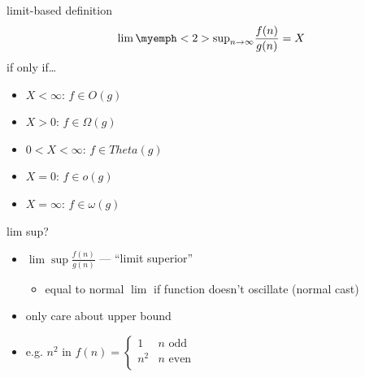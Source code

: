 \begin{frame}{limit-based definition}
\[\lim\myemph<2>{\sup}_{n\to\infty} \frac{f(n)}{g(n)} = X\]
if only if\ldots
\begin{itemize}
\item $X < \infty$: $f\in O(g)$
\item $X > 0$: $f \in \Omega(g)$
\item $0 < X < \infty$: $f \in Theta(g)$
\item $X = 0$: $f \in o(g)$
\item $X = \infty$: $f \in \omega(g)$
\end{itemize}
\end{frame}

\begin{frame}{lim sup?}
\begin{itemize}
\item $\lim\sup \frac{f(n)}{g(n)}$ --- ``limit superior''
    \begin{itemize}
    \item equal to normal $\lim$ if function doesn't oscillate (normal cast)
    \end{itemize}
\item only care about upper bound
\item e.g. $n^2$ in  $f(n) = \begin{cases} 1 & n \text{ odd} \\n^2 & n \text{ even} \\ \end{cases}$
\end{itemize}
\end{frame}

